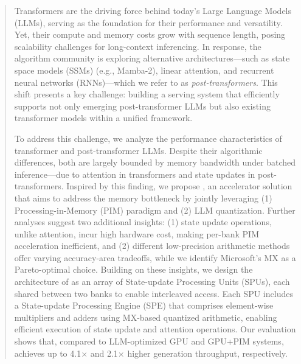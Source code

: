 \begin{abstract}
  Transformers are the driving force behind today's Large Language
  Models (LLMs), serving as the foundation for their performance and
  versatility.
  Yet, their compute and memory costs grow with sequence length,
  posing scalability challenges for long-context inferencing.
  In response, the algorithm community is exploring alternative
  architectures—such as state space models (SSMs) (e.g., Mamba-2),
  linear attention, and recurrent neural networks (RNNs)—which we
  refer to as \emph{post-transformers}.
  This shift presents a key challenge: building a serving system that
  efficiently supports not only emerging post-transformer LLMs but
  also existing transformer models within a unified framework.

  To address this challenge, we analyze the performance
  characteristics of transformer and post-transformer LLMs.
  Despite their algorithmic differences, both are largely
  bounded by memory bandwidth under batched inference—due to
  attention in transformers and state updates in post-transformers.
  Inspired by this finding, we propose \sysname{}, an accelerator
  solution that aims to address the memory bottleneck by jointly
  leveraging (1) Processing-in-Memory (PIM) paradigm and (2) LLM quantization.
  Further analyses suggest two additional insights: (1) state update
  operations, unlike attention, incur high hardware cost, making
  per-bank PIM acceleration inefficient, and (2) different
  low-precision arithmetic methods offer varying accuracy-area
  tradeoffs, while we identify Microsoft's MX as a Pareto-optimal choice.
  Building on these insights, we design the architecture of
  \sysname{} as an array of
  State-update Processing Units (SPUs), each shared between two banks
  to enable interleaved access.
  Each SPU includes a State-update Processing Engine (SPE) that
  comprises element-wise multipliers and adders using MX-based
  quantized arithmetic, enabling efficient execution of state update
  and attention operations.
  Our evaluation shows that, compared to LLM-optimized GPU and
  GPU+PIM systems, \sysname{} achieves up to 4.1$\times$ and
  2.1$\times$ higher generation throughput, respectively.

\end{abstract}

